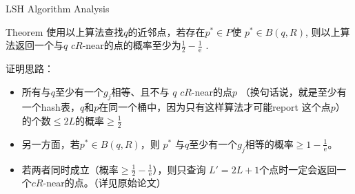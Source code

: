 \begin{frame}{LSH Algorithm Analysis}
    \begin{block}{Theorem}
        使用以上算法查找$q$的近邻点，若存在$p^{*} \in P$使 $p^{*} \in B(q, R)$, 则以上算法返回一个与$q$ $cR$-near的点的概率至少为$\frac{1}{2} - \frac{1}{\mathrm e }$   .
    \end{block}
    证明思路：
    \begin{itemize}
        \item 所有与$q$至少有一个$g_j$相等、且不与 $q$ $cR$-near的点$p$ （换句话说，就是至少有一个hash表，$q$和$p$在同一个桶中，因为只有这样算法才可能report 这个点$p$） 的个数$\leqslant 2L$的概率$\geqslant \frac{1}{2}$
        \item 另一方面，若$p^{*} \in B(q, R)$，则 $p^{*}$ 与$q$至少有一个$g_j$相等的概率$\geqslant 1 - \frac{1}{\mathrm e}$。
        \item 若两者同时成立（概率$\geqslant \frac{1}{2}  - \frac{1}{\mathrm e}$），则只查询 $L' = 2L+1$个点时一定会返回一个$cR$-near的点。（详见原始论文）
    \end{itemize}
\end{frame}